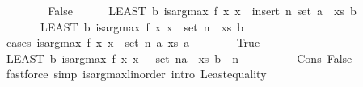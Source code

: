 \begin{isabellebody}
\ \ \isamarkupfalse%
\isanewline
\ \ \ \ \isamarkupfalse%
\ False\isanewline
\ \ \ \ \isamarkupfalse%
\ {\isachardoublequoteopen}{\isacharparenleft}{\kern0pt}LEAST\ b{\isachardot}{\kern0pt}\ is{\isacharunderscore}{\kern0pt}arg{\isacharunderscore}{\kern0pt}max\ f\ {\isacharparenleft}{\kern0pt}{\isasymlambda}x{\isachardot}{\kern0pt}\ x\ {\isasymin}\ insert\ n\ {\isacharparenleft}{\kern0pt}set\ {\isacharparenleft}{\kern0pt}a\ {\isacharhash}{\kern0pt}\ xs{\isacharparenright}{\kern0pt}{\isacharparenright}{\kern0pt}{\isacharparenright}{\kern0pt}\ b{\isacharparenright}{\kern0pt}\isanewline
\ \ \ \ \ \ {\isacharequal}{\kern0pt}\ {\isacharparenleft}{\kern0pt}LEAST\ b{\isachardot}{\kern0pt}\ is{\isacharunderscore}{\kern0pt}arg{\isacharunderscore}{\kern0pt}max\ f\ {\isacharparenleft}{\kern0pt}{\isasymlambda}x{\isachardot}{\kern0pt}\ x\ {\isasymin}\ {\isacharparenleft}{\kern0pt}set\ {\isacharparenleft}{\kern0pt}n\ {\isacharhash}{\kern0pt}\ xs{\isacharparenright}{\kern0pt}{\isacharparenright}{\kern0pt}{\isacharparenright}{\kern0pt}\ b{\isacharparenright}{\kern0pt}{\isachardoublequoteclose}\isanewline
\ \ \ \ \isamarkupfalse%
\ {\isacharparenleft}{\kern0pt}cases\ {\isachardoublequoteopen}is{\isacharunderscore}{\kern0pt}arg{\isacharunderscore}{\kern0pt}max\ f\ {\isacharparenleft}{\kern0pt}{\isasymlambda}x{\isachardot}{\kern0pt}\ x\ {\isasymin}\ set\ {\isacharparenleft}{\kern0pt}n\ {\isacharhash}{\kern0pt}a{\isacharhash}{\kern0pt}\ xs{\isacharparenright}{\kern0pt}{\isacharparenright}{\kern0pt}\ a{\isachardoublequoteclose}{\isacharparenright}{\kern0pt}\isanewline
\ \ \ \ \ \ \isamarkupfalse%
\ True\isanewline
\ \ \ \ \ \ \isamarkupfalse%
\ {\isachardoublequoteopen}{\isacharparenleft}{\kern0pt}LEAST\ b{\isachardot}{\kern0pt}\ is{\isacharunderscore}{\kern0pt}arg{\isacharunderscore}{\kern0pt}max\ f\ {\isacharparenleft}{\kern0pt}{\isasymlambda}x{\isachardot}{\kern0pt}\ x\ {\isasymin}\ \ {\isacharparenleft}{\kern0pt}set\ {\isacharparenleft}{\kern0pt}n{\isacharhash}{\kern0pt}a\ {\isacharhash}{\kern0pt}\ xs{\isacharparenright}{\kern0pt}{\isacharparenright}{\kern0pt}{\isacharparenright}{\kern0pt}\ b{\isacharparenright}{\kern0pt}\ {\isacharequal}{\kern0pt}\ n{\isachardoublequoteclose}\isanewline
\ \ \ \ \ \ \ \ \isamarkupfalse%
\ Cons\ False\isanewline
\ \ \ \ \ \ \ \ \isamarkupfalse%
\ {\isacharparenleft}{\kern0pt}fastforce\ simp{\isacharcolon}{\kern0pt}\ is{\isacharunderscore}{\kern0pt}arg{\isacharunderscore}{\kern0pt}max{\isacharunderscore}{\kern0pt}linorder\ intro{\isacharbang}{\kern0pt}{\isacharcolon}{\kern0pt}\ Least{\isacharunderscore}{\kern0pt}equality{\isacharparenright}{\kern0pt}\isanewline

\end{isabellebody}
